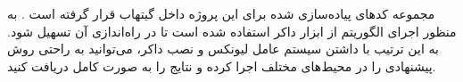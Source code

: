

مجموعه کدهای پیاده‌سازی شده برای این پروژه داخل گیتهاب قرار گرفته است . به منظور اجرای الگوریتم از ابزار داکر استفاده شده است تا در راه‌اندازی آن تسهیل شود. به این ترتیب با داشتن سیستم عامل لیونکس و نصب داکر، می‌توانید به راحتی روش پیشنهادی را در محیط‌های مختلف اجرا کرده و نتایج را به صورت کامل دریافت کنید.

